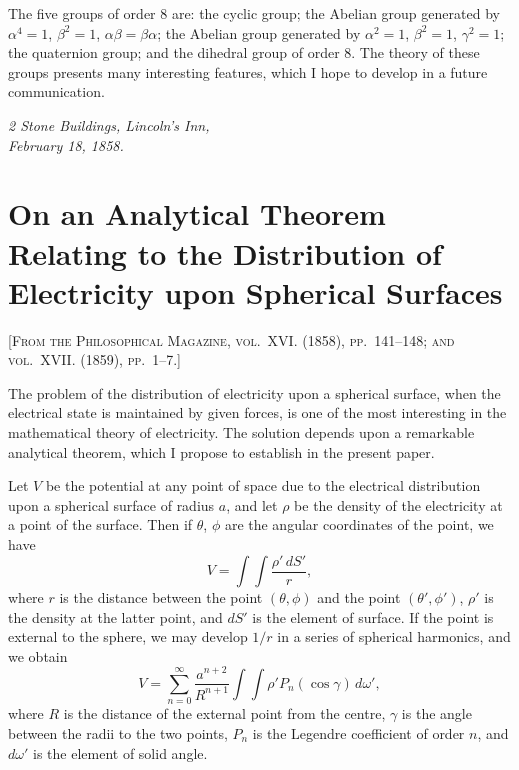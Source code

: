 \documentclass[11pt,a4paper]{book}
\begin{document}
The five groups of order 8 are: the cyclic group; the Abelian group generated by $\alpha^4=1$, $\beta^2=1$, $\alpha\beta=\beta\alpha$; the Abelian group generated by $\alpha^2=1$, $\beta^2=1$, $\gamma^2=1$; the quaternion group; and the dihedral group of order 8. The theory of these groups presents many interesting features, which I hope to develop in a future communication.

\medskip
\noindent\textit{2 Stone Buildings, Lincoln's Inn,\\February 18, 1858.}

\newpage



\section{On an Analytical Theorem Relating to the Distribution of Electricity upon Spherical Surfaces}

\textsc{[From the Philosophical Magazine, vol.~XVI. (1858), pp.~141--148; and vol.~XVII. (1859), pp.~1--7.]}
\label{paper:244}

\setcounter{page}{93}

The problem of the distribution of electricity upon a spherical surface, when the electrical state is maintained by given forces, is one of the most interesting in the mathematical theory of electricity. The solution depends upon a remarkable analytical theorem, which I propose to establish in the present paper.

Let $V$ be the potential at any point of space due to the electrical distribution upon a spherical surface of radius $a$, and let $\rho$ be the density of the electricity at a point of the surface. Then if $\theta$, $\phi$ are the angular coordinates of the point, we have
\[
V = \int\!\!\int \frac{\rho' \, dS'}{r},
\]
where $r$ is the distance between the point $(\theta,\phi)$ and the point $(\theta',\phi')$, $\rho'$ is the density at the latter point, and $dS'$ is the element of surface. If the point is external to the sphere, we may develop $1/r$ in a series of spherical harmonics, and we obtain
\[
V = \sum_{n=0}^{\infty} \frac{a^{n+2}}{R^{n+1}} \int\!\!\int \rho' P_n(\cos\gamma) \, d\omega',
\]
where $R$ is the distance of the external point from the centre, $\gamma$ is the angle between the radii to the two points, $P_n$ is the Legendre coefficient of order $n$, and $d\omega'$ is the element of solid angle.
\end{document}

